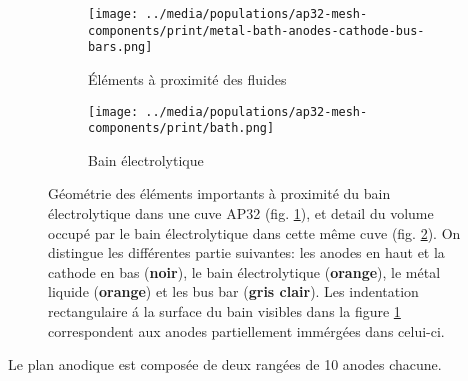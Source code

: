 \begin{figure}[t]
  \begin{center}
    \begin{subfigure}[b]{0.49\textwidth}
      \texttt{[image: ../media/populations/ap32-mesh-components/print/metal-bath-anodes-cathode-bus-bars.png]}
      \caption{Éléments à proximité des fluides}

      \label{fig:ap32-geometry-bath}
    \end{subfigure}
    \begin{subfigure}[b]{0.49\textwidth}
      \texttt{[image: ../media/populations/ap32-mesh-components/print/bath.png]}
      \caption{Bain électrolytique}
      \label{fig:ap32-geometry-electrolyte}
    \end{subfigure}
    \caption{Géométrie des éléments importants à proximité
      du bain électrolytique dans une cuve AP32
      (fig. \ref{fig:ap32-geometry-bath}), et detail du volume
      occupé par le bain électrolytique dans cette même cuve
      (fig. \ref{fig:ap32-geometry-electrolyte}). On distingue les
      différentes partie suivantes: les anodes en haut et la cathode
      en bas (\textbf{noir}), le bain électrolytique
      (\textbf{orange}), le métal liquide (\textbf{orange}) et les
      bus bar (\textbf{gris clair}).  Les indentation rectangulaire
      á la surface du bain visibles dans la figure
      \ref{fig:ap32-geometry-bath} correspondent aux anodes
      partiellement immérgées dans celui-ci.}
    \label{fig:ap32-geometry}
  \end{center}
\end{figure}

Le plan anodique est composée de deux rangées de 10 anodes chacune.
